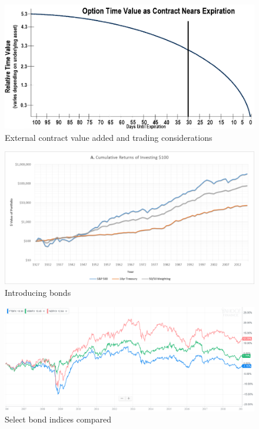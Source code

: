 \documentclass{article}
\begin{document}
\vspace{10pt}

\begin{figure}[!htb]
    \centering
    \includegraphics[width=\textwidth]{imgs/25.png}
    \caption{External contract value added and trading considerations}
\end{figure}

\vspace{10pt}

\begin{figure}[!htb]
    \centering
    \includegraphics[width=\textwidth]{imgs/26.png}
    \caption{Introducing bonds}
\end{figure}

\vspace{10pt}

\begin{figure}[!htb]
    \centering
    \includegraphics[width=\textwidth]{imgs/27.png}
    \caption{Select bond indices compared}
\end{figure}
\end{document}
